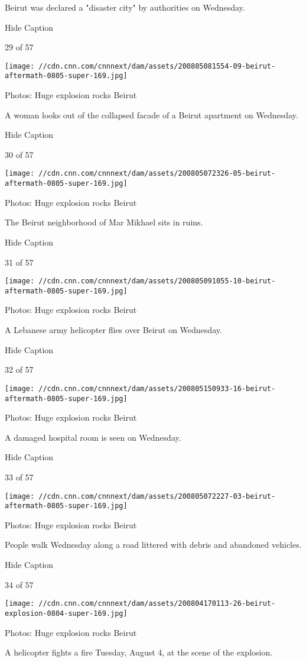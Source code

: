 Beirut was declared a "disaster city" by authorities on Wednesday.

Hide Caption

29 of 57

\texttt{[image: //cdn.cnn.com/cnnnext/dam/assets/200805081554-09-beirut-aftermath-0805-super-169.jpg]}

Photos: Huge explosion rocks Beirut

A woman looks out of the collapsed facade of a Beirut apartment on
Wednesday.

Hide Caption

30 of 57

\texttt{[image: //cdn.cnn.com/cnnnext/dam/assets/200805072326-05-beirut-aftermath-0805-super-169.jpg]}

Photos: Huge explosion rocks Beirut

The Beirut neighborhood of Mar Mikhael sits in ruins.

Hide Caption

31 of 57

\texttt{[image: //cdn.cnn.com/cnnnext/dam/assets/200805091055-10-beirut-aftermath-0805-super-169.jpg]}

Photos: Huge explosion rocks Beirut

A Lebanese army helicopter flies over Beirut on Wednesday.

Hide Caption

32 of 57

\texttt{[image: //cdn.cnn.com/cnnnext/dam/assets/200805150933-16-beirut-aftermath-0805-super-169.jpg]}

Photos: Huge explosion rocks Beirut

A damaged hospital room is seen on Wednesday.

Hide Caption

33 of 57

\texttt{[image: //cdn.cnn.com/cnnnext/dam/assets/200805072227-03-beirut-aftermath-0805-super-169.jpg]}

Photos: Huge explosion rocks Beirut

People walk Wednesday along a road littered with debris and abandoned
vehicles.

Hide Caption

34 of 57

\texttt{[image: //cdn.cnn.com/cnnnext/dam/assets/200804170113-26-beirut-explosion-0804-super-169.jpg]}

Photos: Huge explosion rocks Beirut

A helicopter fights a fire Tuesday, August 4, at the scene of the
explosion.

